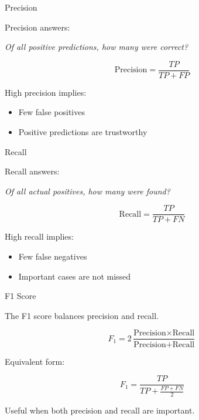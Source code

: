 \documentclass[aspectratio=169]{beamer}
\begin{document}
\begin{frame}{Precision}
	
	Precision answers:
	
	\vspace{0.3em}
	
	\emph{Of all positive predictions, how many were correct?}
	
	\vspace{0.5em}
	
	\[
	\text{Precision}
	=
	\frac{TP}
	{TP+FP}
	\]
	
	\vspace{0.5em}
	
	High precision implies:
	
	\begin{itemize}
		\item Few false positives
		\item Positive predictions are trustworthy
	\end{itemize}
	
\end{frame}


\begin{frame}{Recall}
	
	Recall answers:
	
	\vspace{0.3em}
	
	\emph{Of all actual positives, how many were found?}
	
	\vspace{0.5em}
	
	\[
	\text{Recall}
	=
	\frac{TP}
	{TP+FN}
	\]
	
	\vspace{0.5em}
	
	High recall implies:
	
	\begin{itemize}
		\item Few false negatives
		\item Important cases are not missed
	\end{itemize}
	
\end{frame}


\begin{frame}{F1 Score}
	
	The F1 score balances precision and recall.
	
	\[
	F_1
	=
	2
	\frac{\text{Precision}\times\text{Recall}}
	{\text{Precision}+\text{Recall}}
	\]
	
	\vspace{0.5em}
	
	Equivalent form:
	
	\[
	F_1
	=
	\frac{TP}
	{TP+\frac{FP+FN}{2}}
	\]
	
	\vspace{0.5em}
	
	Useful when both precision and recall are important.
	
\end{frame}
\end{document}
